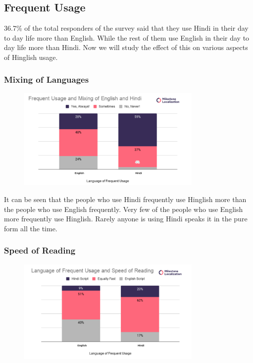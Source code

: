 \documentclass{article}
\begin{document}
\subsection{Frequent Usage}
36.7\% of the total responders of the survey said that they use Hindi in their day to day life more than English. While the rest of them use English in their day to day life more than Hindi. Now we will study the effect of this on various aspects of Hinglish usage.

\subsubsection{Mixing of Languages}

\begin{figure}[H]
    \centering
    \includegraphics[width=0.8\textwidth]{plots/frequent_mixing_language.png}
\end{figure}

It can be seen that the people who use Hindi frequently use Hinglish more than the people who use English frequently. Very few of the people who use English more frequently use Hinglish. Rarely anyone is using Hindi speaks it in the pure form all the time. 

\subsubsection{Speed of Reading}

\begin{figure}[H]
    \centering
    \includegraphics[width=0.8\textwidth]{plots/frequent_faster_read.png}
\end{figure}
\end{document}
